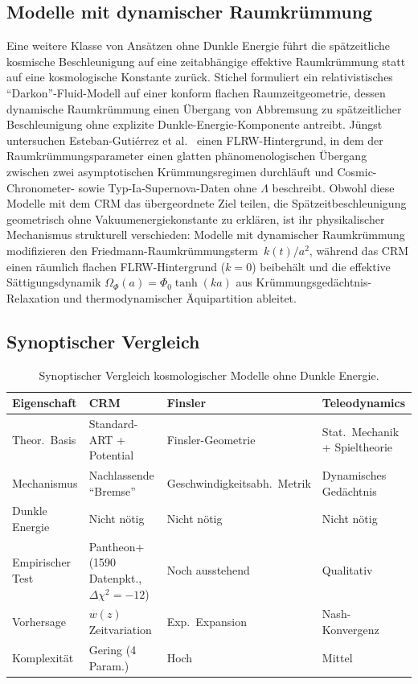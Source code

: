 \documentclass[aps,prd,twocolumn,superscriptaddress,nofootinbib]{revtex4-2}
\begin{document}
\subsection{Modelle mit dynamischer Raumkrümmung}
\label{subsec:dynamische_kruemmung}

Eine weitere Klasse von Ansätzen ohne Dunkle Energie führt die spätzeitliche kosmische Beschleunigung auf eine zeitabhängige effektive Raumkrümmung statt auf eine kosmologische Konstante zurück. Stichel \cite{Stichel2016} formuliert ein relativistisches ``Darkon''-Fluid-Modell auf einer konform flachen Raumzeitgeometrie, dessen dynamische Raumkrümmung einen Übergang von Abbremsung zu spätzeitlicher Beschleunigung ohne explizite Dunkle-Energie-Komponente antreibt. Jüngst untersuchen Esteban-Gutiérrez et al.\ \cite{EstebanGutierrez2025} einen FLRW-Hintergrund, in dem der Raumkrümmungsparameter einen glatten phänomenologischen Übergang zwischen zwei asymptotischen Krümmungsregimen durchläuft und Cosmic-Chronometer- sowie Typ-Ia-Supernova-Daten ohne $\Lambda$ beschreibt. Obwohl diese Modelle mit dem CRM das übergeordnete Ziel teilen, die Spätzeitbeschleunigung geometrisch ohne Vakuumenergiekonstante zu erklären, ist ihr physikalischer Mechanismus strukturell verschieden: Modelle mit dynamischer Raumkrümmung modifizieren den Friedmann-Raumkrümmungsterm~$k(t)/a^2$, während das CRM einen räumlich flachen FLRW-Hintergrund ($k = 0$) beibehält und die effektive Sättigungsdynamik $\Omega_\Phi(a) = \Phi_0 \tanh(k a)$ aus Krümmungsgedächtnis-Relaxation und thermodynamischer Äquipartition ableitet.

\subsection{Synoptischer Vergleich}
\label{subsec:synopse}

\begin{table}[tbp]
\centering
\caption{Synoptischer Vergleich kosmologischer Modelle ohne Dunkle Energie.}
\label{tab:synopse}
\begin{tabular}{llll}
\toprule
\textbf{Eigenschaft} & \textbf{CRM} & \textbf{Finsler} & \textbf{Teleodynamics} \\
\midrule
Theor.\ Basis & Standard-ART + Potential & Finsler-Geometrie & Stat.\ Mechanik + Spieltheorie \\
Mechanismus & Nachlassende ``Bremse'' & Geschwindigkeitsabh.\ Metrik & Dynamisches Gedächtnis \\
Dunkle Energie & Nicht nötig & Nicht nötig & Nicht nötig \\
Empirischer Test & Pantheon+ (1590 Datenpkt., $\Delta\chi^2{=}{-}12$) & Noch ausstehend & Qualitativ \\
Vorhersage & $w(z)$ Zeitvariation & Exp.\ Expansion & Nash-Konvergenz \\
Komplexität & Gering (4 Param.) & Hoch & Mittel \\
\bottomrule
\end{tabular}
\end{table}
\end{document}
